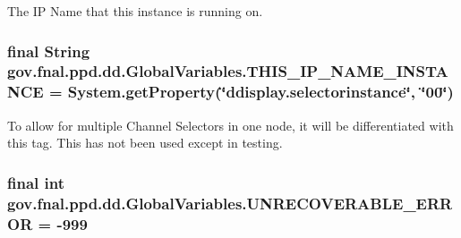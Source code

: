 The I\-P Name that this instance is running on. \hypertarget{classgov_1_1fnal_1_1ppd_1_1dd_1_1GlobalVariables_ae5fe9c75fedaa742e5f68baad8768d7f}{
\subsubsection[{T\-H\-I\-S\-\_\-\-I\-P\-\_\-\-N\-A\-M\-E\-\_\-\-I\-N\-S\-T\-A\-N\-C\-E}]{\setlength{\rightskip}{0pt plus 5cm}final String gov.\-fnal.\-ppd.\-dd.\-Global\-Variables.\-T\-H\-I\-S\-\_\-\-I\-P\-\_\-\-N\-A\-M\-E\-\_\-\-I\-N\-S\-T\-A\-N\-C\-E = System.\-get\-Property(\char`\"{}ddisplay.\-selectorinstance\char`\"{}, \char`\"{}00\char`\"{})\hspace{0.3cm}{\ttfamily [static]}}}\label{classgov_1_1fnal_1_1ppd_1_1dd_1_1GlobalVariables_ae5fe9c75fedaa742e5f68baad8768d7f}
To allow for multiple Channel Selectors in one node, it will be differentiated with this tag. This has not been used except in testing. \hypertarget{classgov_1_1fnal_1_1ppd_1_1dd_1_1GlobalVariables_af2d69bd16e463355307ead1135160408}{
\subsubsection[{U\-N\-R\-E\-C\-O\-V\-E\-R\-A\-B\-L\-E\-\_\-\-E\-R\-R\-O\-R}]{\setlength{\rightskip}{0pt plus 5cm}final int gov.\-fnal.\-ppd.\-dd.\-Global\-Variables.\-U\-N\-R\-E\-C\-O\-V\-E\-R\-A\-B\-L\-E\-\_\-\-E\-R\-R\-O\-R = -\/999\hspace{0.3cm}{\ttfamily [static]}}}\label{classgov_1_1fnal_1_1ppd_1_1dd_1_1GlobalVariables_af2d69bd16e463355307ead1135160408}

